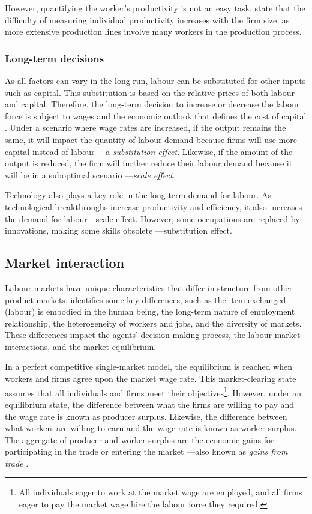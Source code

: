 However, quantifying the worker's productivity is not an easy task. \citet{Kaufman2003} state that the difficulty of measuring individual productivity increases with the firm size, as more extensive production lines involve many workers in the production process. 

\subsubsection{Long-term decisions} 

As all factors can vary in the long run, labour can be substituted for other inputs such as capital. This substitution is based on the relative prices of both labour and capital. Therefore, the long-term decision to increase or decrease the labour force is subject to wages and the economic outlook that defines the cost of capital \citep{Kaufman2003}. Under a scenario where wage rates are increased, if the output remains the same, it will impact the quantity of labour demand because firms will use more capital instead of labour —a \textit{substitution effect}. Likewise, if the amount of the output is reduced, the firm will further reduce their labour demand because it will be in a suboptimal scenario —\textit{scale effect}. 

Technology also plays a key role in the long-term demand for labour. As technological breakthroughs increase productivity and efficiency, it also increases the demand for labour—scale effect. However, some occupations are replaced by innovations, making some skills obsolete —substitution effect. 

\subsection{Market interaction}

Labour markets have unique characteristics that differ in structure from other product markets. \citet{Kaufman2003} identifies some key differences, such as the item exchanged (labour) is embodied in the human being, the long-term nature of employment relationship, the heterogeneity of workers and jobs, and the diversity of markets. These differences impact the agents' decision-making process, the labour market interactions, and the market equilibrium. 

In a perfect competitive single-market model, the equilibrium is reached when workers and firms agree upon the market wage rate. This market-clearing state assumes that all individuals and firms meet their objectives\footnote{All individuals eager to work at the market wage are employed, and all firms eager to pay the market wage hire the labour force they required. }. However, under an equilibrium state, the difference between what the firms are willing to pay and the wage rate is known as producer surplus. Likewise, the difference between what workers are willing to earn and the wage rate is known as worker surplus. The aggregate of producer and worker surplus are the economic gains for participating in the trade or entering the market —also known as \textit{gains from trade} \citep{Borjas2020}. 

